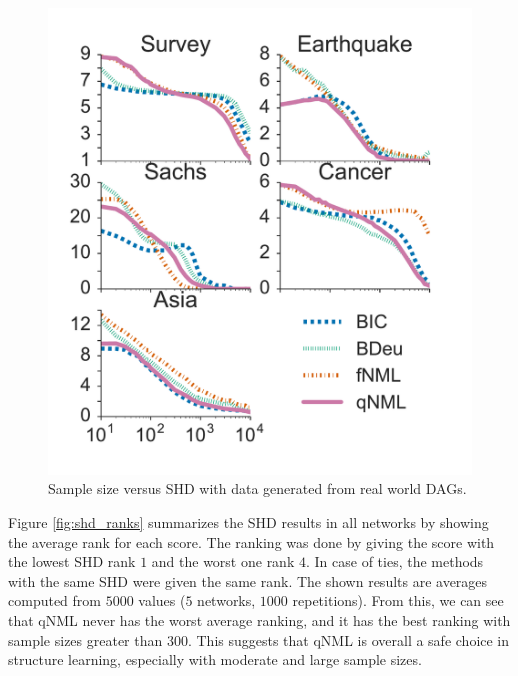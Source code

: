 \begin{figure}[h]
\centering
\includegraphics[width=\columnwidth]{qNML_images/shd_all.pdf}
\caption{Sample size versus SHD with data generated from real world DAGs.}
\label{fig:all_shd}
\end{figure}

Figure \ref{fig:shd_ranks} summarizes the SHD results in all networks by showing the average rank for each score. The ranking was done by giving the score with the lowest SHD rank $1$ and the worst one rank $4$. In case of ties, the methods with the same SHD were given the same rank. The shown results are averages computed from $5000$ values ($5$ networks, $1000$ repetitions). From this, we can see that qNML never has the worst average ranking, and it has the best ranking with sample sizes greater than $300$. This suggests that qNML is overall a safe choice in structure learning, especially with moderate and large sample sizes.

